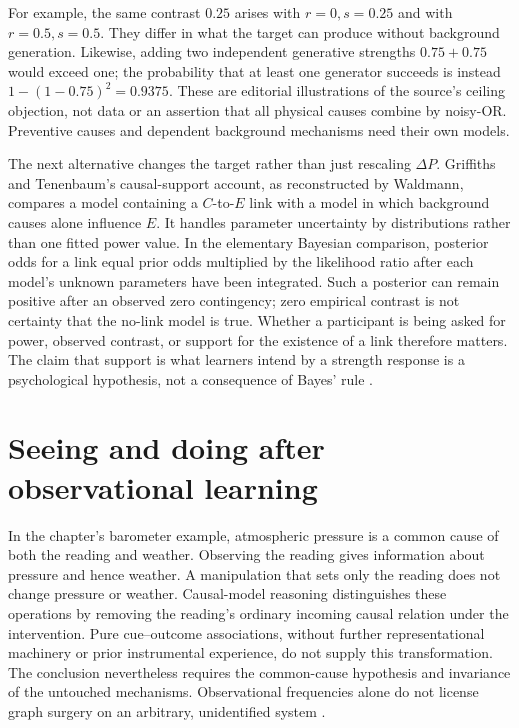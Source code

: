For example, the same contrast \(0.25\) arises with \(r=0,s=0.25\)
and with \(r=0.5,s=0.5\). They differ in what the target can produce
without background generation. Likewise, adding two independent
generative strengths \(0.75+0.75\) would exceed one; the probability
that at least one generator succeeds is instead
\(1-(1-0.75)^2=0.9375\). These are editorial illustrations of the
source's ceiling objection, not data or an assertion that all physical
causes combine by noisy-OR. Preventive causes and dependent background
mechanisms need their own models.

The next alternative changes the target rather than just rescaling
\(\Delta P\). Griffiths and Tenenbaum's causal-support account, as
reconstructed by Waldmann, compares a model containing a \(C\)-to-\(E\)
link with a model in which background causes alone influence \(E\).
It handles parameter uncertainty by distributions rather than one fitted
power value. In the elementary Bayesian comparison, posterior odds for
a link equal prior odds multiplied by the likelihood ratio after each
model's unknown parameters have been integrated. Such a posterior can
remain positive after an observed zero contingency; zero empirical
contrast is not certainty that the no-link model is true. Whether a
participant is being asked for power, observed contrast, or support
for the existence of a link therefore matters. The claim that support
is what learners intend by a strength response is a psychological
hypothesis, not a consequence of Bayes' rule
\cite[p.~442]{Waldmann2021EverydayCausal}.

\section{Seeing and doing after observational learning}
\label{sec:p19-rat72-intervention}

In the chapter's barometer example, atmospheric pressure is a common
cause of both the reading and weather. Observing the reading gives
information about pressure and hence weather. A manipulation that
sets only the reading does not change pressure or weather. Causal-model
reasoning distinguishes these operations by removing the reading's
ordinary incoming causal relation under the intervention. Pure
cue--outcome associations, without further representational machinery
or prior instrumental experience, do not supply this transformation.
The conclusion nevertheless requires the common-cause hypothesis and
invariance of the untouched mechanisms. Observational frequencies
alone do not license graph surgery on an arbitrary, unidentified system
\cite[p.~442]{Waldmann2021EverydayCausal}.

